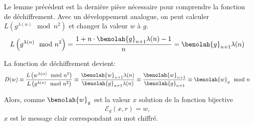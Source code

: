 	Le lemme précédent est la dernière pièce nécessaire pour comprendre la fonction de déchiffrement.
	Avec un développement analogue, on peut calculer $L\left(g^{\lambda(n)}\mod{n^2}\right)$ et changer la valeur $w$ à $g$.
	$$L\left(g^{\lambda(n)}\mod{n^2}\right) = \frac{1+n\cdot \benolah{g}_{n+1} \lambda(n) -1}{n}  = \benolah{g}_{n+1}\lambda(n)$$
	
	La fonction de déchiffrement devient:
	\begin{equation}\label{equation:def}
	D(w) \equiv \frac{L\left(w^{\lambda(n)}\mod{n^2}\right) }{L\left(g^{\lambda(n)}\mod{n^2}\right)} \equiv \frac{\benolah{w  }_{n+1}\lambda(n) }{\benolah{g}_{n+1}\lambda(n)} \equiv \frac{\benolah{w  }_{n+1}}{\benolah{g}_{n+1}} \equiv \benolah{w  }_{g}\mod{n}
	\end{equation}

	Alors, comme $\benolah{w}_{g}$ est la valeur $x$ solution de la fonction bijective $$\mathcal{E}_g(x,r) = w\text{,}$$ $x$ est le message clair correspondant au mot chiffré.



	
